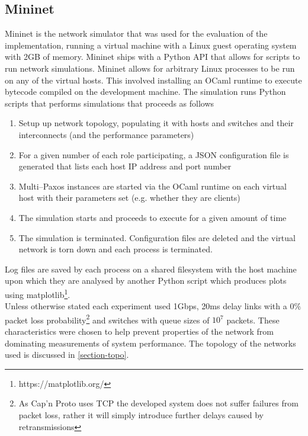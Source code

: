 \subsection{Mininet}

Mininet is the network simulator that was used for the evaluation of the implementation, running a virtual machine with a Linux guest operating system with 2GB of memory. Mininet ships with a Python API that allows for scripts to run network simulations. Mininet allows for arbitrary Linux processes to be run on any of the virtual hosts. This involved installing an OCaml runtime to execute bytecode compiled on the development machine. The simulation runs Python scripts that performs simulations that proceeds as follows

\begin{enumerate}
  \item Setup up network topology, populating it with hosts and switches and their interconnects (and the performance parameters)
  \item For a given number of each role participating, a JSON configuration file is generated that lists each host IP address and port number
  \item Multi--Paxos instances are started via the OCaml runtime on each virtual host with their parameters set (e.g. whether they are clients)
  \item The simulation starts and proceeds to execute for a given amount of time
  \item The simulation is terminated. Configuration files are deleted and the virtual network is torn down and each process is terminated.
\end{enumerate}

Log files are saved by each process on a shared filesystem with the host machine upon which they are analysed by another Python script which produces plots using matplotlib\footnote{https://matplotlib.org/}. \\

Unless otherwise stated each experiment used 1Gbps, 20ms delay links with a $0\%$ packet loss probability\footnote{As Cap'n Proto uses TCP the developed system does not suffer failures from packet loss, rather it will simply introduce further delays caused by retransmissions} and switches with queue sizes of $10^7$ packets. These characteristics were chosen to help prevent properties of the network from dominating measurements of system performance. The topology of the networks used is discussed in \ref{section-topo}.


